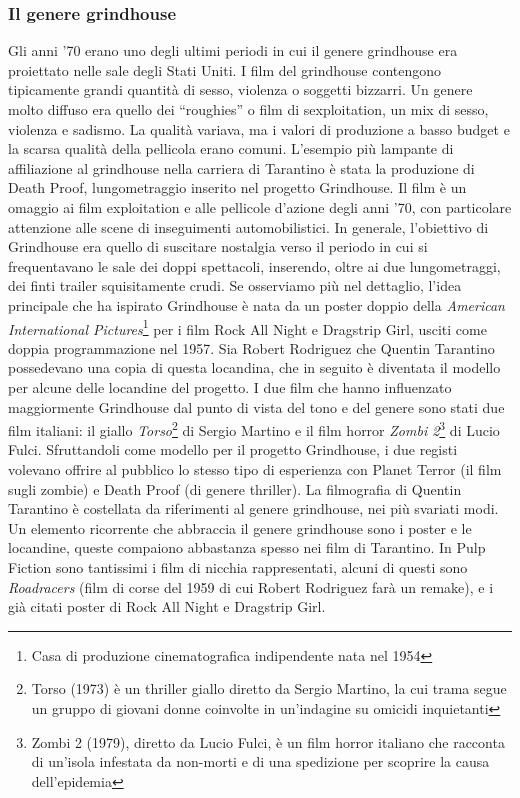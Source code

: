 \documentclass[12pt]{article} %
\begin{document}
\subsubsection*{Il genere grindhouse}
\begin{flushleft}
    Gli anni '70 erano uno degli ultimi periodi in cui il genere grindhouse era proiettato nelle sale degli Stati Uniti. I film del grindhouse contengono tipicamente grandi quantità di sesso, violenza o soggetti bizzarri. Un genere molto diffuso era quello dei “roughies” o film di sexploitation, un mix di sesso, violenza e sadismo. La qualità variava, ma i valori di produzione a basso budget e la scarsa qualità della pellicola erano comuni.
    L'esempio più lampante di affiliazione al grindhouse nella carriera di Tarantino è stata la produzione di Death Proof, lungometraggio inserito nel progetto Grindhouse.
    Il film è un omaggio ai film exploitation e alle pellicole d'azione degli anni '70, con particolare attenzione alle scene di inseguimenti automobilistici.
    In generale, l'obiettivo di Grindhouse era quello di suscitare nostalgia verso il periodo in cui si frequentavano le sale dei doppi spettacoli, inserendo, oltre ai due lungometraggi, dei finti trailer squisitamente crudi.
    Se osserviamo più nel dettaglio, l'idea principale che ha ispirato Grindhouse è nata da un poster doppio della \textit{American International Pictures}\footnote{Casa di produzione cinematografica indipendente nata nel 1954} per i film Rock All Night e Dragstrip Girl, usciti come doppia programmazione nel 1957. Sia Robert Rodriguez che Quentin Tarantino possedevano una copia di questa locandina, che in seguito è diventata il modello per alcune delle locandine del progetto.
    I due film che hanno influenzato maggiormente Grindhouse dal punto di vista del tono e del genere sono stati due film italiani: il giallo \textit{Torso}\footnote{Torso (1973) è un thriller giallo diretto da Sergio Martino, la cui trama segue un gruppo di giovani donne coinvolte in un'indagine su omicidi inquietanti} di Sergio Martino e il film horror \textit{Zombi 2}\footnote{Zombi 2 (1979), diretto da Lucio Fulci, è un film horror italiano che racconta di un'isola infestata da non-morti e di una spedizione per scoprire la causa dell'epidemia} di Lucio Fulci. Sfruttandoli come modello per il progetto Grindhouse, i due registi volevano offrire al pubblico lo stesso tipo di esperienza con Planet Terror (il film sugli zombie) e Death Proof (di genere thriller).
    La filmografia di Quentin Tarantino è costellata da riferimenti al genere grindhouse, nei più svariati modi. Un elemento ricorrente che abbraccia il genere grindhouse sono i poster e le locandine, queste compaiono abbastanza spesso nei film di Tarantino. In Pulp Fiction sono tantissimi i film di nicchia rappresentati, alcuni di questi sono \textit{Roadracers} (film di corse del 1959 di cui Robert Rodriguez farà un remake), e i già citati poster di Rock All Night e Dragstrip Girl.
\end{flushleft}
\end{document}

